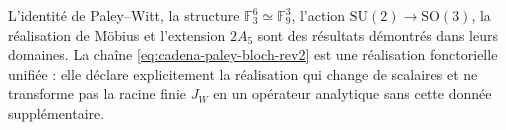 \begin{statusbox}[title={Provenance et portée de la chaîne projective}]
L'identité de Paley--Witt, la structure
\(\mathbb F_3^6\simeq\mathbb F_9^3\), l'action
\(\mathrm{SU}(2)\to\mathrm{SO}(3)\), la réalisation de Möbius et l'extension
\(2A_5\) sont des résultats démontrés dans leurs domaines. La chaîne
\eqref{eq:cadena-paley-bloch-rev2} est une réalisation fonctorielle unifiée :
elle déclare explicitement la réalisation qui change de scalaires et ne transforme pas
la racine finie \(J_W\) en un opérateur analytique sans cette donnée supplémentaire.
\end{statusbox}
